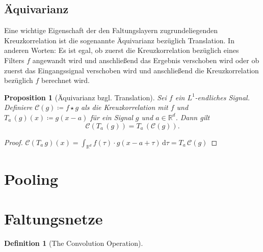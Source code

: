 \documentclass[paper=a4, 	%
		fontsize=11pt, 		%
		abstracton, 	%
		headsepline, 	%
		notitlepage	%
		]{scrartcl}
\newtheorem{proposition}[theorem]{Proposition}
\theoremstyle{definition}
\newtheorem{definition}[theorem]{Definition}
\newcommand{\R}{\mathbb{R}}
\newcommand{\diff}{\,\textrm{d}}
\newcommand{\todo}[1]{{\color{red} #1}}
\newcommand{\transl}[2]{T_{#1}\, #2}
\begin{document}
\subsection{Äquivarianz}

\todo{Eine wichtige Eigenschaft der den Faltungslayern zugrundeliegenden Kreuzkorrelation ist die sogenannte Äquivarianz bezüglich Translation.
In anderen Worten: Es ist egal, ob zuerst die Kreuzkorrelation bezüglich eines Filters $f$ angewandt wird und anschließend das Ergebnis verschoben wird oder ob zuerst das Eingangssignal verschoben wird und anschließend die Kreuzkorrelation bezüglich $f$ berechnet wird.

\begin{proposition}[Äquivarianz bzgl. Translation]
    Sei $f$ ein $L^1$-endliches Signal.
    Definiere $\mathcal{C}(g)\coloneqq f\star g$ als die Kreuzkorrelation mit $f$ und $\transl{a}{(g)}(x) \coloneqq g(x - a)$ für ein Signal $g$ und $a\in\R^d$.
    Dann gilt \[ \mathcal{C}(\transl{a}{(g)}) = \transl{a}{(\mathcal{C}(g))}. \]
\end{proposition}

\begin{proof}
    $\mathcal{C}(T_a\, g)(x) = \int_{\R^d} f(\tau) \cdot g(x - a + \tau) \diff \tau = \transl{a}{\mathcal{C}(g)}$
\end{proof}


}


\section{Pooling}



\section{Faltungsnetze}



\begin{definition}[The Convolution Operation]
    
\end{definition}

\clearpage          %
\thispagestyle{empty}

\end{document}
